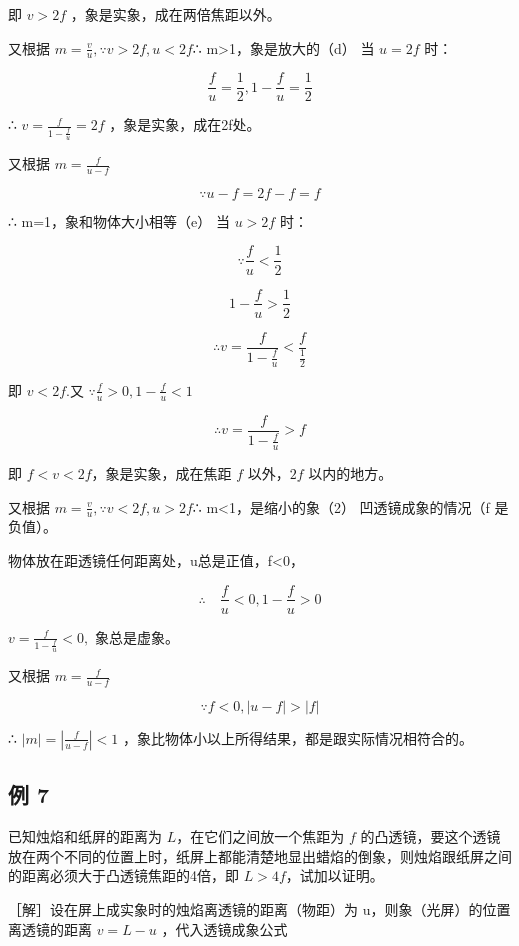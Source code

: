 即 \(v > 2f\) ，象是实象，成在两倍焦距以外。

又根据 \(m = \frac{v}{u},\because v > 2f,u < 2f\)∴
m\textgreater1，象是放大的（d） 当 \(u = 2f\) 时：

\[
\frac {f}{u} = \frac {1}{2}, 1 - \frac {f}{u} = \frac {1}{2}
\]

∴ \(v=\frac{f}{1-\frac{f}{u}}=2f\) ，象是实象，成在2f处。

又根据 \(m = \frac{f}{u - f}\)

\[
\because u - f = 2 f - f = f
\]

∴ m=1，象和物体大小相等（e） 当 \(u > 2f\) 时：

\[
\because \frac {f}{u} <   \frac {1}{2}
\]

\[
1 - \frac {f}{u} > \frac {1}{2}
\]

\[
\therefore v = \frac {f}{1 - \frac {f}{u}} <   \frac {f}{\frac {1}{2}}
\]

即 \(v < 2f.\)又 \(\because \frac{f}{u} > 0, 1 - \frac{f}{u} < 1\)

\[
\therefore v = \frac {f}{1 - \frac {f}{u}} > f
\]

即 \(f < v < 2f\)，象是实象，成在焦距 \(f\) 以外，\(2f\) 以内的地方。

又根据 \(m = \frac{v}{u}, \because v < 2f, u > 2f\)∴
m\textless1，是缩小的象（2） 凹透镜成象的情况（f 是负值）。

物体放在距透镜任何距离处，u总是正值，f\textless0，

\[
\therefore \quad \frac {f}{u} <   0, 1 - \frac {f}{u} > 0
\]

\(v=\frac{f}{1-\frac{f}{u}}<0,\) 象总是虚象。

又根据 \(m = \frac{f}{u - f}\)

\[
\because f <   0, | u - f | > | f |
\]

∴ \(\left|m\right|=\left|\frac{f}{u-f}\right|<1\)
，象比物体小以上所得结果，都是跟实际情况相符合的。

\subsection{例 7}

已知烛焰和纸屏的距离为 \(L\)，在它们之间放一个焦距为 \(f\)
的凸透镜，要这个透镜放在两个不同的位置上时，纸屏上都能清楚地显出蜡焰的倒象，则烛焰跟纸屏之间的距离必须大于凸透镜焦距的4倍，即
\(L > 4f\)，试加以证明。

［解］设在屏上成实象时的烛焰离透镜的距离（物距）为
u，则象（光屏）的位置离透镜的距离 \(v = L - u\) ，代入透镜成象公式

